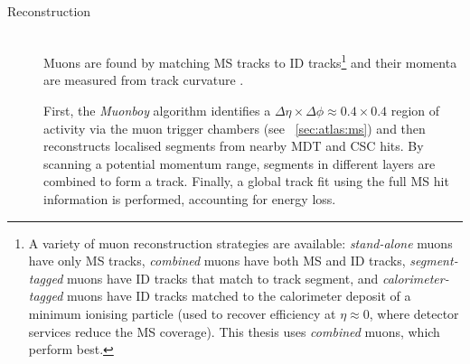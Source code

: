 \begin{description}
\item[Reconstruction] \hfill \\
	Muons are found by matching \ac{MS} tracks to \ac{ID} tracks\footnote{
		A variety of muon reconstruction strategies are available: \textit{stand-alone} 
		muons have only \ac{MS} tracks, \textit{combined} muons have both \ac{MS} and 
		\ac{ID} tracks, \textit{segment-tagged} muons have \ac{ID} tracks that match to 
		 track segment, and \textit{calorimeter-tagged} muons have \ac{ID} 
		tracks matched to the calorimeter deposit of a minimum ionising particle (used to 
		recover efficiency at $\eta \approx 0$, where detector services reduce the \ac{MS}
		coverage). This thesis uses \textit{combined} muons, which perform best.
	}
	and their momenta are measured from track curvature \cite{ATLAS:ExpectPerf}.

	First, the \textit{Muonboy} algorithm \cite{Muons:algorithms} identifies a 
	$\Delta\eta \times \Delta\phi \approx 0.4 \times 0.4$ region of activity via the muon 
	trigger chambers (see \Section~\ref{sec:atlas:ms}) and then reconstructs localised 
	segments from nearby \acs{MDT} and \acs{CSC} hits. By scanning a potential momentum 
	range, segments in different layers are combined to form a track. Finally, a global 
	track fit using the full \ac{MS} hit information is performed, accounting for energy 
	loss.


\end{description}
